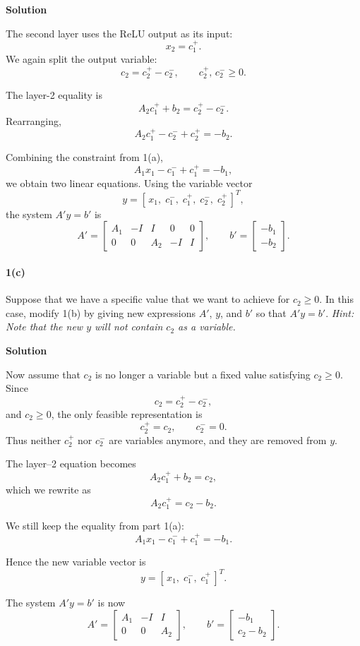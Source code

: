 \documentclass[11pt]{article}
\begin{document}
	\noindent\textbf{Solution}
	
	The second layer uses the ReLU output as its input:
	\[
	x_2 = c_1^+.
	\]
	We again split the output variable:
	\[
	c_2 = c_2^+ - c_2^- , \qquad c_2^+,\, c_2^- \ge 0.
	\]
	
	The layer-2 equality is
	\[
	A_2 c_1^+ + b_2 = c_2^+ - c_2^- .
	\]
	Rearranging,
	\[
	A_2 c_1^+ - c_2^- + c_2^+ = -b_2.
	\]
	
	Combining the constraint from 1(a),
	\[
	A_1 x_1 - c_1^- + c_1^+ = -b_1,
	\]
	we obtain two linear equations.  
	Using the variable vector
	\[
	y = [\,x_1,\; c_1^-,\; c_1^+,\; c_2^-,\; c_2^+\,]^T,
	\]
	the system $A' y = b'$ is
	\[
	A' =
	\begin{bmatrix}
		A_1 & -I & I & 0 & 0 \\
		0 & 0 & A_2 & -I & I
	\end{bmatrix},
	\qquad
	b' =
	\begin{bmatrix}
		-b_1 \\
		-b_2
	\end{bmatrix}.
	\]
	
	\paragraph{1(c)} Suppose that we have a specific value that we want to achieve for $c_2 \ge 0$. In this case, modify 1(b) by giving new expressions $A'$, $y$, and $b'$ so that $A' y = b'$.  
	\textit{Hint: Note that the new $y$ will not contain $c_2$ as a variable.}
	
	\noindent\textbf{Solution}
	
	Now assume that $c_2$ is no longer a variable but a fixed value satisfying $c_2 \ge 0$.
	Since
	\[
	c_2 = c_2^+ - c_2^-,
	\]
	and $c_2 \ge 0$, the only feasible representation is
	\[
	c_2^+ = c_2, \qquad c_2^- = 0.
	\]
	Thus neither $c_2^+$ nor $c_2^-$ are variables anymore, and they are removed from $y$.
	
	The layer--2 equation becomes
	\[
	A_2 c_1^+ + b_2 = c_2,
	\]
	which we rewrite as
	\[
	A_2 c_1^+ = c_2 - b_2.
	\]
	
	We still keep the equality from part 1(a):
	\[
	A_1 x_1 - c_1^- + c_1^+ = -b_1.
	\]
	
	Hence the new variable vector is
	\[
	y = [\, x_1,\; c_1^-,\; c_1^+ \,]^T.
	\]
	
	The system $A' y = b'$ is now
	\[
	A' =
	\begin{bmatrix}
		A_1 & -I & I \\
		0   & 0  & A_2
	\end{bmatrix},
	\qquad
	b' =
	\begin{bmatrix}
		-b_1 \\
		c_2 - b_2
	\end{bmatrix}.
	\]
	
\end{document}
